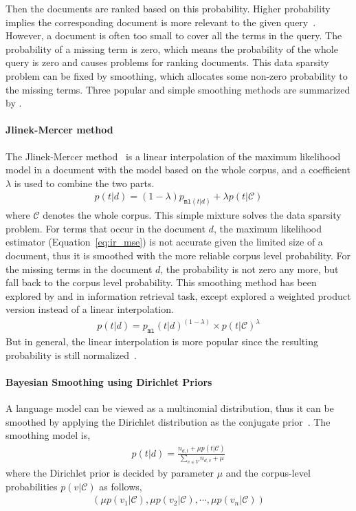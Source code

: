 Then the documents are ranked based on this probability. Higher probability implies the corresponding document is more relevant to the given query~\citep{song-99}. However, a document is often too small to cover all the terms in the query. The probability of a missing term is zero, which means the probability of the whole query is zero and causes problems for ranking documents. This data sparsity problem can be fixed by smoothing, which allocates some non-zero probability to the missing terms. Three popular and simple smoothing methods are summarized by \cite{zhai-01}. 

\paragraph{Jlinek-Mercer method}

The Jlinek-Mercer method~\cite{Jelinek-1980} is a linear interpolation of the maximum likelihood model in a document with the model based on the whole corpus, and a coefficient $\lambda$ is used to combine the two parts. 
\begin{align}
p(t|d) = (1 - \lambda) p_{\texttt{ml}(t|d)} + \lambda p(t|\mathcal{C})
\end{align}
where $\mathcal{C}$ denotes the whole corpus. This simple mixture solves the data sparsity problem. For terms that occur in the document $d$, the maximum likelihood estimator (Equation~\ref{eq:ir_mse}) is not accurate given the limited size of a document, thus it is smoothed with the more reliable corpus level probability. For the missing terms in the document $d$, the probability is not zero any more, but fall back to the corpus level probability. This smoothing method has been explored by \cite{PonteCroft} and \cite{song-99} in information retrieval task, except \cite{PonteCroft} explored a weighted product version instead of a linear interpolation. 
\begin{align}
p(t|d) = p_{\texttt{ml}}(t|d)^{(1 - \lambda) } \times p(t|\mathcal{C})^{\lambda}
\end{align}
But in general, the linear interpolation is more popular since the resulting probability is still normalized~\cite{song-99}.

\paragraph{Bayesian Smoothing using Dirichlet Priors}

A language model can be viewed as a multinomial distribution, thus it can be smoothed by applying the Dirichlet distribution as the conjugate prior~\citep{mackay95dirichlet}. The smoothing model is,
\begin{align}
p(t|d) = \frac{n_{d,t} + \mu p(t|\mathcal{C})}{\sum_{v \in V} n_{d,v} + \mu}
\end{align}
where the Dirichlet prior is decided by parameter $\mu$ and the corpus-level probabilities $p(v|\mathcal{C})$ as follows,
\begin{align}
(\mu p(v_1 | \mathcal{C}), \mu p(v_2 | \mathcal{C}), \cdots, \mu p(v_n | \mathcal{C}))
\end{align}

